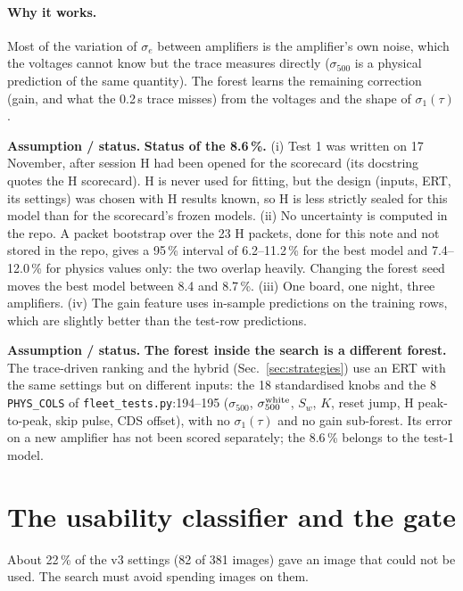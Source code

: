 \documentclass[10pt,a4paper]{article}
\newcommand{\code}[1]{\texttt{\small #1}}
\newcommand{\caveat}[1]{\par\smallskip\noindent\colorbox{orange!10}{\parbox{\dimexpr\linewidth-2\fboxsep}{\small\textbf{Assumption / status.} #1}}\par\smallskip}
\begin{document}
\paragraph{Why it works.} Most of the variation of $\sigma_e$ between amplifiers is the amplifier's own noise, which the
voltages cannot know but the trace measures directly ($\sigma_{500}$ is a physical prediction of the same quantity). The
forest learns the remaining correction (gain, and what the 0.2\,s trace misses) from the voltages and the shape of
$\sigma_1(\tau)$.

\caveat{\textbf{Status of the 8.6\,\%.} (i) Test 1 was written on 17 November, after session H had been opened for the
scorecard (its docstring quotes the H scorecard). H is never used for fitting, but the design (inputs, ERT, its settings)
was chosen with H results known, so H is less strictly sealed for this model than for the scorecard's frozen models.
(ii) No uncertainty is computed in the repo. A packet bootstrap \cite{efron1979} over the 23 H packets, done for this note and
not stored in the repo, gives a 95\,\% interval of 6.2--11.2\,\% for the best model and 7.4--12.0\,\% for physics values only:
the two overlap heavily. Changing the forest seed moves the best model between 8.4 and 8.7\,\%. (iii) One board, one night,
three amplifiers. (iv) The gain feature uses in-sample predictions on the training rows, which are slightly better than the
test-row predictions.}

\caveat{\textbf{The forest inside the search is a different forest.} The trace-driven ranking and the hybrid
(Sec.~\ref{sec:strategies}) use an ERT with the same settings but on different inputs: the 18 standardised knobs and the 8
\code{PHYS\_COLS} of \code{fleet\_tests.py}:194--195 ($\sigma_{500}$, $\sigma_{500}^{\rm white}$, $S_w$, $K$, reset jump,
H peak-to-peak, skip pulse, CDS offset), with no $\sigma_1(\tau)$ and no gain sub-forest. Its error on a new amplifier has not been
scored separately; the 8.6\,\% belongs to the test-1 model.}

\section{The usability classifier and the gate}\label{sec:gate}

About 22\,\% of the v3 settings (82 of 381 images) gave an image that could not be used. The search must avoid spending
images on them.
\end{document}
